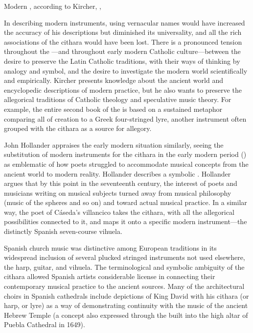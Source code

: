{Modern , according to Kircher, ,
}

In describing modern instruments, using vernacular names would have increased
the accuracy of his descriptions but diminished its universality, and all the
rich associations of the cithara would have been lost.
There is a pronounced tension throughout the ---and throughout
early modern Catholic culture---between the desire to preserve the Latin
Catholic traditions, with their ways of thinking by analogy and symbol, and the
desire to investigate the modern world scientifically and empirically.
Kircher presents  knowledge about the ancient world and
encyclopedic descriptions of modern practice, but he also wants to preserve the
allegorical traditions of Catholic theology and speculative music theory.
For example, the entire second book of the  is based on a
sustained metaphor comparing all of creation to a Greek four-stringed lyre,
another instrument often grouped with the cithara as a source for allegory.

John Hollander appraises the early modern situation similarly, seeing the
substitution of modern instruments for the cithara in the early modern period
() as emblematic of how poets struggled to accommodate
musical concepts from the ancient world to modern reality.
Hollander describes a symbolic .%
    \Autocite[44--51]{Hollander:Untuning}
Hollander argues that by this point in the seventeenth century, the interest of
poets and musicians writing on musical subjects turned away from musical
philosophy (music of the spheres and so on) and toward actual musical practice. 
In a similar way, the poet of Cáseda's villancico takes the cithara, with all
the allegorical possibilities connected to it, and maps it onto a specific
modern instrument---the distinctly Spanish seven-course vihuela.


Spanish church music was distinctive among European traditions in its
widespread inclusion of several plucked stringed instruments not used
elsewhere, the harp, guitar, and vihuela. 
The terminological and symbolic ambiguity of the cithara allowed Spanish
artists considerable license in connecting their contemporary musical practice
to the ancient sources.
Many of the architectural choirs in Spanish cathedrals include depictions of
King David with his cithara (or harp, or lyre) as a way of demonstrating
continuity with the music of the ancient Hebrew Temple (a concept also
expressed through the  built into the high altar of
Puebla Cathedral in 1649).

